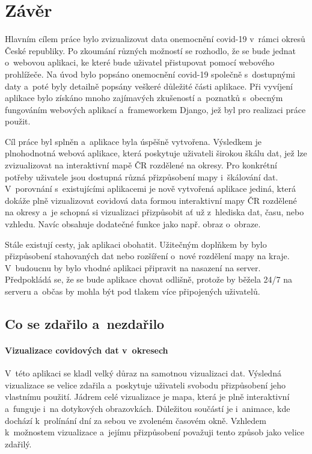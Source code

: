 \chapter{Závěr}

Hlavním cílem práce bylo zvizualizovat data onemocnění covid-19 v~rámci okresů České republiky. Po zkoumání různých možností se rozhodlo, že se bude jednat o~webovou aplikaci, ke které bude uživatel přistupovat pomocí webového prohlížeče. Na úvod bylo popsáno onemocnění covid-19 společně s~dostupnými daty a~poté byly detailně popsány veškeré důležité části aplikace. Při vyvíjení aplikace bylo získáno mnoho zajímavých zkušeností a~poznatků s~obecným fungováním webových aplikací a~frameworkem Django, jež byl pro realizaci práce použit.

Cíl práce byl splněn a~aplikace byla úspěšně vytvořena. Výsledkem je plnohodnotná webová aplikace, která poskytuje uživateli širokou škálu dat, jež lze zvizualizovat na interaktivní mapě ČR rozdělené na okresy. Pro konkrétní potřeby uživatele jsou dostupná různá přizpůsobení mapy i~škálování dat. V~porovnání s~existujícími aplikacemi je nově vytvořená aplikace jediná, která dokáže plně vizualizovat covidová data formou interaktivní mapy ČR rozdělené na okresy a~je schopná si vizualizaci přizpůsobit ať už z~hlediska dat, času, nebo vzhledu. Navíc obsahuje dodatečné funkce jako např. obraz o~obraze.

Stále existují cesty, jak aplikaci obohatit. Užitečným doplňkem by bylo přizpůsobení stahovaných dat nebo rozšíření o~nové rozdělení mapy na kraje. V~budoucnu by bylo vhodné aplikaci připravit na nasazení na server. Předpokládá se, že se bude aplikace chovat odlišně, protože by běžela 24/7 na serveru a~občas by mohla být pod tlakem více připojených uživatelů. 

\section{Co se zdařilo a~nezdařilo}

\subsubsection*{Vizualizace covidových dat v~okresech}

V~této aplikaci se kladl velký důraz na samotnou vizualizaci dat. Výsledná vizualizace se velice zdařila a~poskytuje uživateli svobodu přizpůsobení jeho vlastnímu použití. Jádrem celé vizualizace je mapa, která je plně interaktivní a~funguje i~na dotykových obrazovkách. Důležitou součástí je i~animace, kde dochází k~prolínání dní za sebou ve zvoleném časovém okně. Vzhledem k~možnostem vizualizace a~jejímu přizpůsobení považuji tento způsob jako velice zdařilý.

